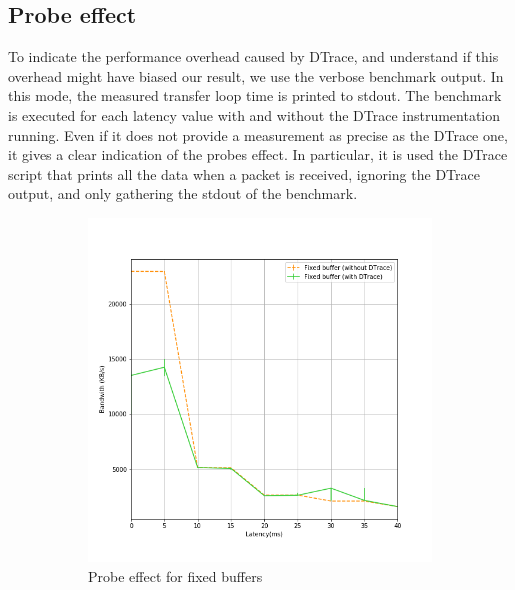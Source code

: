 \documentclass[a4paper,10pt]{article}
\begin{document}
\subsection{Probe effect}

To indicate the performance overhead caused by DTrace, and understand if this overhead might have biased our result, we use the verbose benchmark output. In this mode, the measured transfer loop time is printed to stdout. The benchmark is executed for each latency value with and without the DTrace instrumentation running. Even if it does not provide a measurement as precise as the DTrace one, it gives a clear indication of the probes effect.
In particular, it is used the DTrace script that prints all the data when a packet is received, ignoring the DTrace output, and only gathering the stdout of the benchmark.
\begin{figure}[]
\begin{subfigure}{0.5\textwidth}
   \centering
   \includegraphics[width=\textwidth]{images/fixed_probe_effect.png}
   \caption{Probe effect for fixed buffers}
   \label{fig:fixed_probe}
\end{subfigure}
\qquad
\begin{subfigure}{0.5\textwidth}
   \centering

\end{subfigure}
\end{figure}
\end{document}
